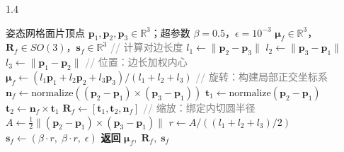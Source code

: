 \begin{algorithm}[htbp]
    \begin{spacing}{1.4}
    \caption{面片高斯属性解析推导算法}
    \label{alg:face_gaussian}
    \begin{algorithmic}[1]
        \REQUIRE 姿态网格面片顶点 $\mathbf{p}_1, \mathbf{p}_2, \mathbf{p}_3 \in \mathbb{R}^3$；超参数 $\beta = 0.5$，$\epsilon = 10^{-3}$
        \ENSURE $\boldsymbol{\mu}_f \in \mathbb{R}^3$，$\mathbf{R}_f \in SO(3)$，$\mathbf{s}_f \in \mathbb{R}^3$
        \STATE \textcolor{gray}{// 计算对边长度}
        \STATE $l_1 \leftarrow \|\mathbf{p}_2 - \mathbf{p}_3\|$
        \STATE $l_2 \leftarrow \|\mathbf{p}_3 - \mathbf{p}_1\|$
        \STATE $l_3 \leftarrow \|\mathbf{p}_1 - \mathbf{p}_2\|$
        \STATE \textcolor{gray}{// 位置：边长加权内心}
        \STATE $\boldsymbol{\mu}_f \leftarrow (l_1 \mathbf{p}_1 + l_2 \mathbf{p}_2 + l_3 \mathbf{p}_3) / (l_1 + l_2 + l_3)$
        \STATE \textcolor{gray}{// 旋转：构建局部正交坐标系}
        \STATE $\mathbf{n}_f \leftarrow \text{normalize}((\mathbf{p}_2 - \mathbf{p}_1) \times (\mathbf{p}_3 - \mathbf{p}_1))$
        \STATE $\mathbf{t}_1 \leftarrow \text{normalize}(\mathbf{p}_2 - \mathbf{p}_1)$
        \STATE $\mathbf{t}_2 \leftarrow \mathbf{n}_f \times \mathbf{t}_1$
        \STATE $\mathbf{R}_f \leftarrow [\mathbf{t}_1, \mathbf{t}_2, \mathbf{n}_f]$
        \STATE \textcolor{gray}{// 缩放：绑定内切圆半径}
        \STATE $A \leftarrow \frac{1}{2}\|(\mathbf{p}_2 - \mathbf{p}_1) \times (\mathbf{p}_3 - \mathbf{p}_1)\|$
        \STATE $r \leftarrow A / ((l_1 + l_2 + l_3) / 2)$
        \STATE $\mathbf{s}_f \leftarrow (\beta \cdot r,\; \beta \cdot r,\; \epsilon)$
        \STATE \textbf{返回} $\boldsymbol{\mu}_f,\; \mathbf{R}_f,\; \mathbf{s}_f$
    \end{algorithmic}
    \end{spacing}
\end{algorithm}